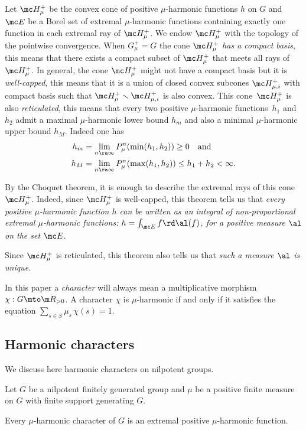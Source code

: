 Let $\mc H_\mu^+$ be the convex cone of positive
$\mu$-harmonic functions $h$ on $G$
and $\mc E$ be a Borel set of extremal $\mu$-harmonic functions containing exactly one
function in each extremal ray of $\mc H_\mu^+$.
We endow $\mc H_\mu^+$ with the topology of the pointwise convergence.
When $G_\mu^+=G$ the cone $\mc H_\mu^+$ \emph{has a compact basis},
this means that there exists a compact subset of $\mc H_\mu^+$
that meets all rays of $\mc H_\mu^+$.
In general, the cone $\mc H_\mu^+$ might not have a compact basis but it is \emph{well-capped},
this means that it is a union of closed convex subcones $\mc H_{\mu,i}^+$
with compact basis such that $\mc H_\mu^+\smallsetminus \mc H_{\mu,i}^+$
is also convex.
This cone~$\mc H_\mu^+$ is also \emph{reticulated}, this means that
every two positive $\mu$-harmonic functions~$h_1$ and~$h_2$
admit a maximal $\mu$-harmonic lower bound $h_m$ and also
a minimal $\mu$-harmonic upper bound $h_M$.
Indeed one has
\begin{align*}
h_m
&=
\lim_{n\ra\infty}P^n_\mu (\min(h_1,h_2))\geq 0
\quad\text{and}\quad \\
h_M
&=
\lim_{n\ra\infty}P^n_\mu (\max(h_1,h_2))
\leq h_1+ h_2<\infty.
\end{align*}

By the Choquet theorem, it is enough to describe the extremal rays of this cone~$\mc H_\mu^+$.
Indeed, since $\mc H_\mu^+$ is well-capped, this theorem tells us
that \emph{every positive $\mu$-harmonic function $h$
can be written as an integral of non-proportional
extremal $\mu$-harmonic functions:
$h=\int_{\mc E}f\rd \al(f)$,
for a positive measure $\al$
on the set $\mc E$}.

Since $\mc H_\mu^+$ is reticulated,
this theorem also tells us that \emph{such a measure $\al$ is unique.}

In this paper a \emph{character}
will always mean a multiplicative morphism $\chi:G\mto \m R_{>0}$.
A character $\chi$ is $\mu$-harmonic if and only if it satisfies
the equation $\sum_{s\in S} \mu_s\,\chi(s)=1$.

\subsection{Harmonic characters}
\bq
We discuss here harmonic characters on nilpotent groups.
\eq

Let $G$ be a nilpotent finitely generated group
and $\mu$ be a positive finite measure on $G$
with finite support generating $G$.

\begin{Lem}
\label{lemcarext}
Every $\mu$-harmonic character of $G$ is an extremal
positive $\mu$-harmonic function.
\end{Lem}

